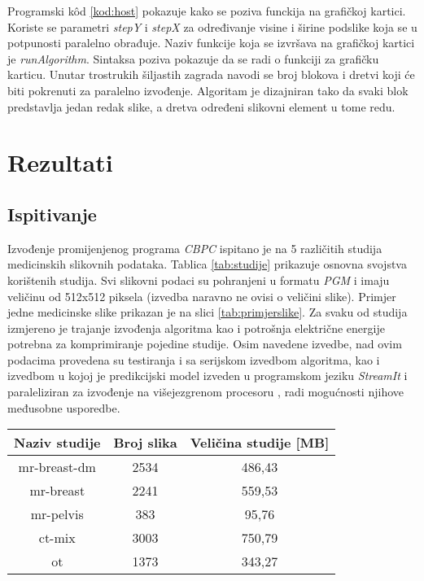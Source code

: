 \documentclass[times, utf8, zavrsni, numeric, sort]{fer}
\begin{document}
Programski k\^{o}d \ref{kod:host} pokazuje kako se poziva funckija na grafičkoj kartici. Koriste se parametri \emph{stepY} i \emph{stepX} za određivanje visine i širine podslike koja se u potpunosti paralelno obrađuje. Naziv funkcije koja se izvršava na grafičkoj kartici je \emph{runAlgorithm}. Sintaksa poziva pokazuje da se radi o funkciji za grafičku karticu. Unutar trostrukih šiljastih zagrada navodi se broj blokova i dretvi koji će biti pokrenuti za paralelno izvođenje. Algoritam je dizajniran tako da svaki blok predstavlja jedan redak slike, a dretva određeni slikovni element u tome redu.



\chapter{Rezultati}





\section{Ispitivanje}

Izvođenje promijenjenog programa \emph{CBPC} ispitano je na 5 različitih studija medicinskih slikovnih podataka. Tablica \ref{tab:studije} prikazuje osnovna svojstva korištenih studija. Svi slikovni podaci su pohranjeni u formatu \emph{PGM} i imaju veličinu od 512x512 piksela (izvedba naravno ne ovisi o veličini slike). Primjer jedne medicinske slike prikazan je na slici \ref{tab:primjerslike}. Za svaku od studija izmjereno je trajanje izvođenja algoritma kao i potrošnja električne energije potrebna za komprimiranje pojedine studije. Osim navedene izvedbe, nad ovim podacima provedena su testiranja i sa serijskom izvedbom algoritma, kao i izvedbom u kojoj je predikcijski model izveden u programskom jeziku \emph{StreamIt} \cite{Thies:PhD:09} i paraleliziran za izvođenje na višejezgrenom procesoru \cite{Knezovic:12}, radi mogućnosti njihove međusobne usporedbe.
\begin{center}
 \label{tab:studije}
\begin{tabular}{| c | c | c |}
\hline
Naziv studije & Broj slika & Veličina studije [MB]
\\
\hline
mr-breast-dm & 2534 & 486,43
\\
\hline
mr-breast & 2241 & 559,53
\\
\hline
mr-pelvis & 383 & 95,76
\\
\hline
ct-mix & 3003  & 750,79
\\
\hline
ot & 1373 & 343,27
\\
\hline
\end{tabular}
\end{center}
\end{document}
